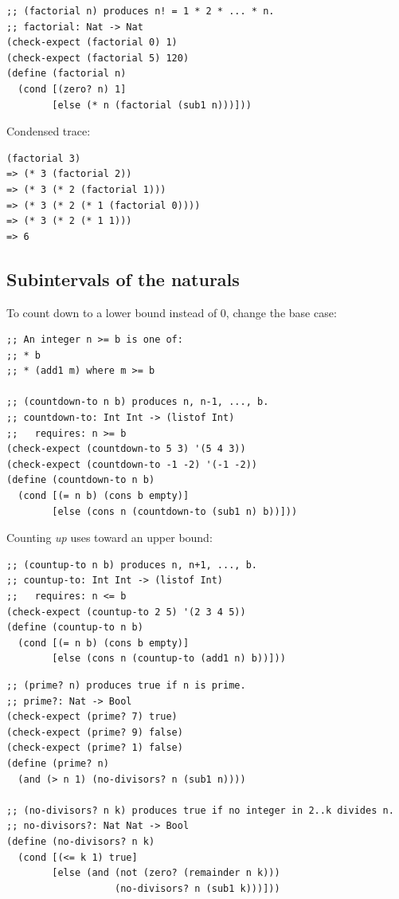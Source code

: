 \begin{example}[Factorial]
\begin{lstlisting}[style=racket]
;; (factorial n) produces n! = 1 * 2 * ... * n.
;; factorial: Nat -> Nat
(check-expect (factorial 0) 1)
(check-expect (factorial 5) 120)
(define (factorial n)
  (cond [(zero? n) 1]
        [else (* n (factorial (sub1 n)))]))
\end{lstlisting}
Condensed trace:
\begin{lstlisting}[style=racket]
(factorial 3)
=> (* 3 (factorial 2))
=> (* 3 (* 2 (factorial 1)))
=> (* 3 (* 2 (* 1 (factorial 0))))
=> (* 3 (* 2 (* 1 1)))
=> 6
\end{lstlisting}
\end{example}

\subsection{Subintervals of the naturals}
To count down to a lower bound  instead of 0, change the base case:
\begin{lstlisting}[style=racket]
;; An integer n >= b is one of:
;; * b
;; * (add1 m) where m >= b

;; (countdown-to n b) produces n, n-1, ..., b.
;; countdown-to: Int Int -> (listof Int)
;;   requires: n >= b
(check-expect (countdown-to 5 3) '(5 4 3))
(check-expect (countdown-to -1 -2) '(-1 -2))
(define (countdown-to n b)
  (cond [(= n b) (cons b empty)]
        [else (cons n (countdown-to (sub1 n) b))]))
\end{lstlisting}

Counting \emph{up} uses  toward an upper bound:
\begin{lstlisting}[style=racket]
;; (countup-to n b) produces n, n+1, ..., b.
;; countup-to: Int Int -> (listof Int)
;;   requires: n <= b
(check-expect (countup-to 2 5) '(2 3 4 5))
(define (countup-to n b)
  (cond [(= n b) (cons b empty)]
        [else (cons n (countup-to (add1 n) b))]))
\end{lstlisting}

\begin{example}
\begin{lstlisting}[style=racket]
;; (prime? n) produces true if n is prime.
;; prime?: Nat -> Bool
(check-expect (prime? 7) true)
(check-expect (prime? 9) false)
(check-expect (prime? 1) false)
(define (prime? n)
  (and (> n 1) (no-divisors? n (sub1 n))))

;; (no-divisors? n k) produces true if no integer in 2..k divides n.
;; no-divisors?: Nat Nat -> Bool
(define (no-divisors? n k)
  (cond [(<= k 1) true]
        [else (and (not (zero? (remainder n k)))
                   (no-divisors? n (sub1 k)))]))
\end{lstlisting}
\end{example}

